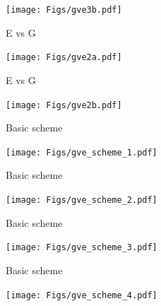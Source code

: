 \documentclass[12pt]{article}
\newcommand{\headsize}{\fontsize{35}{35} \selectfont}
\begin{document}
\vfill

\centerline{\texttt{[image: Figs/gve3b.pdf]}}

\newpage

\headsize \color{myyellow}
\hfill \begin{minipage}{5.75in}
\centering
E vs G
\end{minipage}

\vfill

\centerline{\texttt{[image: Figs/gve2a.pdf]}}

\newpage


\headsize \color{myyellow}
\hfill \begin{minipage}{5.75in}
\centering
E vs G
\end{minipage}

\vfill

\centerline{\texttt{[image: Figs/gve2b.pdf]}}





\newpage


\headsize \color{myyellow}
\hfill \begin{minipage}{5.75in}
\centering
Basic scheme
\end{minipage}

\vfill

\centerline{\texttt{[image: Figs/gve\_scheme\_1.pdf]}}

\newpage

\headsize \color{myyellow}
\hfill \begin{minipage}{5.75in}
\centering
Basic scheme
\end{minipage}

\vfill

\centerline{\texttt{[image: Figs/gve\_scheme\_2.pdf]}}

\newpage

\headsize \color{myyellow}
\hfill \begin{minipage}{5.75in}
\centering
Basic scheme
\end{minipage}

\vfill

\centerline{\texttt{[image: Figs/gve\_scheme\_3.pdf]}}

\newpage

\headsize \color{myyellow}
\hfill \begin{minipage}{5.75in}
\centering
Basic scheme
\end{minipage}

\vfill

\centerline{\texttt{[image: Figs/gve\_scheme\_4.pdf]}}
\end{document}
